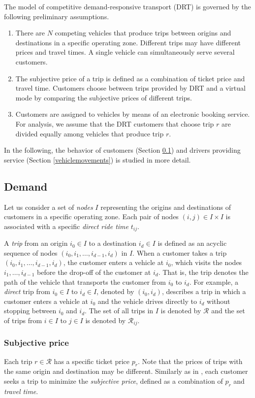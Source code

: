 \documentclass[dissertation,draft*]{aaltoseries}
\begin{document}
The model of competitive demand-responsive transport (DRT) is governed by the following preliminary assumptions.
\begin{enumerate}
\item
There are $N$ competing vehicles that produce trips between 
origins and destinations in a specific operating zone. 
Different trips may have different prices and
travel times. A single vehicle can simultaneously serve several customers.
\item
The subjective price of a trip is defined as a combination of ticket price and travel time.
Customers choose between trips provided by 
DRT and a virtual mode by comparing the subjective 
prices of different trips.
\item
Customers are assigned to vehicles by means of an electronic booking service.
For analysis, we assume that the DRT customers that 
choose trip $r$ are divided equally among vehicles that produce trip $r$. 
\end{enumerate} 
In the following, the behavior of customers (Section \ref{demand}) and drivers providing service 
(Section \ref{vehiclemovements}) is studied in more detail.

\subsection{Demand}
\label{demand}
Let us consider a set of \emph{nodes} $I$ representing the origins and destinations of customers in a specific operating zone.
Each pair of nodes $(i,j) \in I \times I$ is associated with a specific \emph{direct ride time} $t_{ij}$.

A \emph{trip} from an origin $i_0 \in I$ to a destination $i_d \in I$ is defined as an acyclic sequence of nodes 
$(i_0,i_1,\ldots,i_{d-1},i_d)$ in $I$.
When a customer takes a trip $(i_0,i_1,\ldots,i_{d-1},i_d)$, the customer enters a vehicle at $i_0$, which
visits the nodes $i_1,\ldots,i_{d-1}$ before the drop-off of the customer at $i_d$. That is, the
trip denotes the path of the vehicle that transports the customer from $i_0$ to $i_d$.
For example, a \emph{direct} trip from $i_0 \in I$ to $i_d \in I$, denoted by $(i_0,i_d)$, describes a trip in which a customer enters 
a vehicle at $i_0$ and the vehicle drives directly to $i_d$ without stopping between $i_0$ and $i_d$. 
The set of all trips in $I$ is denoted by $\mathcal{R}$ and the set of trips from $i\in I$ to $j \in I$ is denoted by $\mathcal{R}_{ij}$.

\subsubsection{Subjective price}
Each trip $r \in \mathcal{R}$ has a specific ticket price $p_r$. 
Note that the prices of trips with the same origin and destination may be different.
Similarly as in \citep{yang2010}, each customer seeks a trip to minimize the \emph{subjective price}, 
defined as a combination of $p_r$ and \emph{travel time}. 
\end{document}
